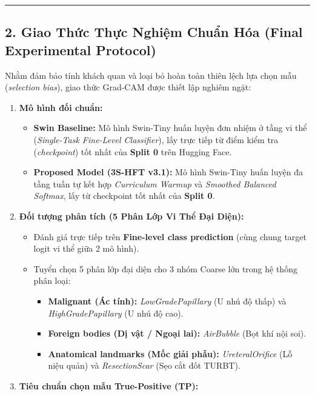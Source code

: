 \documentclass[
  11pt,
  a4paper,
]{article}
\providecommand{\tightlist}{%
  \setlength{\itemsep}{0pt}\setlength{\parskip}{0pt}}
\begin{document}
\begin{center}\rule{0.5\linewidth}{0.5pt}\end{center}

\subsection{2. Giao Thức Thực Nghiệm Chuẩn Hóa (Final Experimental
Protocol)}\label{giao-thux1ee9c-thux1ef1c-nghiux1ec7m-chuux1ea9n-huxf3a-final-experimental-protocol}

Nhằm đảm bảo tính khách quan và loại bỏ hoàn toàn thiên lệch lựa chọn
mẫu (\emph{selection bias}), giao thức Grad-CAM được thiết lập nghiêm
ngặt:

\begin{enumerate}
\def\labelenumi{\arabic{enumi}.}
\tightlist
\item
  \textbf{Mô hình đối chuẩn:}

  \begin{itemize}
  \tightlist
  \item
    \textbf{Swin Baseline:} Mô hình Swin-Tiny huấn luyện đơn nhiệm ở
    tầng vi thể (\emph{Single-Task Fine-Level Classifier}), lấy trực
    tiếp từ điểm kiểm tra (\emph{checkpoint}) tốt nhất của \textbf{Split
    0} trên Hugging Face.
  \item
    \textbf{Proposed Model (3S-HFT v3.1):} Mô hình Swin-Tiny huấn luyện
    đa tầng tuần tự kết hợp \emph{Curriculum Warmup} và \emph{Smoothed
    Balanced Softmax}, lấy từ checkpoint tốt nhất của \textbf{Split 0}.
  \end{itemize}
\item
  \textbf{Đối tượng phân tích (5 Phân Lớp Vi Thể Đại Diện):}

  \begin{itemize}
  \tightlist
  \item
    Đánh giá trực tiếp trên \textbf{Fine-level class prediction} (cùng
    chung target logit vi thể giữa 2 mô hình).
  \item
    Tuyển chọn 5 phân lớp đại diện cho 3 nhóm Coarse lớn trong hệ thống
    phân loại:

    \begin{itemize}
    \tightlist
    \item
      \textbf{Malignant (Ác tính):} \emph{LowGradePapillary} (U nhú độ
      thấp) và \emph{HighGradePapillary} (U nhú độ cao).
    \item
      \textbf{Foreign bodies (Dị vật / Ngoại lai):} \emph{AirBubble}
      (Bọt khí nội soi).
    \item
      \textbf{Anatomical landmarks (Mốc giải phẫu):}
      \emph{UreteralOrifice} (Lỗ niệu quản) và \emph{ResectionScar} (Sẹo
      cắt đốt TURBT).
    \end{itemize}
  \end{itemize}
\item
  \textbf{Tiêu chuẩn chọn mẫu True-Positive (TP):}


\end{enumerate}
\end{document}

